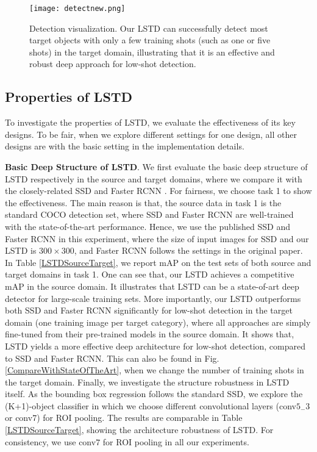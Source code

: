 \documentclass[letterpaper]{article} \usepackage{aaai18}  \usepackage{times}  \usepackage{helvet}  \usepackage{courier}  \usepackage{url}  \usepackage{graphicx}
\begin{document}
\begin{figure*}
\centering
\texttt{[image: detectnew.png]}
\caption{Detection visualization.
Our LSTD can successfully detect most target objects with only a few training shots (such as one or five shots) in the target domain,
illustrating that it is an effective and robust deep approach for low-shot detection.}
\label{detectdifferentshot}
\end{figure*}


\subsection{Properties of LSTD}
To investigate the properties of LSTD,
we evaluate the effectiveness of its key designs.
To be fair,
when we explore different settings for one design,
all other designs are with the basic setting in the implementation details.


\textbf{Basic Deep Structure of LSTD}.
We first evaluate the basic deep structure of LSTD respectively in the source and target domains,
where we compare it with the closely-related SSD \cite{Liueccv2016} and Faster RCNN \cite{Renpami2016}.
For fairness,
we choose task 1 to show the effectiveness.
The main reason is that,
the source data in task 1 is the standard COCO detection set,
where SSD and Faster RCNN are well-trained with the state-of-the-art performance.
Hence,
we use the published SSD \cite{Liueccv2016} and Faster RCNN \cite{Renpami2016} in this experiment,
where
the size of input images for SSD and our LSTD is $300\times300$,
and Faster RCNN follows the settings in the original paper.
In Table \ref{LSTDSourceTarget},
we report mAP on the test sets of both source and target domains in task 1.
One can see that,
our LSTD achieves a competitive mAP in the source domain.
It illustrates that LSTD can be a state-of-art deep detector for large-scale training sets.
More importantly,
our LSTD outperforms both SSD and Faster RCNN significantly for low-shot detection in the target domain (one training image per target category),
where
all approaches are simply fine-tuned from their pre-trained models in the source domain.
It shows that,
LSTD yields a more effective deep architecture for low-shot detection,
compared to SSD and Faster RCNN.
This can also be found in Fig. \ref{CompareWithStateOfTheArt},
when we change the number of training shots in the target domain.
Finally,
we investigate the structure robustness in LSTD itself.
As the bounding box regression follows the standard SSD,
we explore the (K+1)-object classifier in which we choose different convolutional layers (conv$5_{-}3$ or conv$7$) for ROI pooling.
The results are comparable in Table \ref{LSTDSourceTarget},
showing the architecture robustness of LSTD.
For consistency,
we use conv$7$ for ROI pooling in all our experiments.
\end{document}
